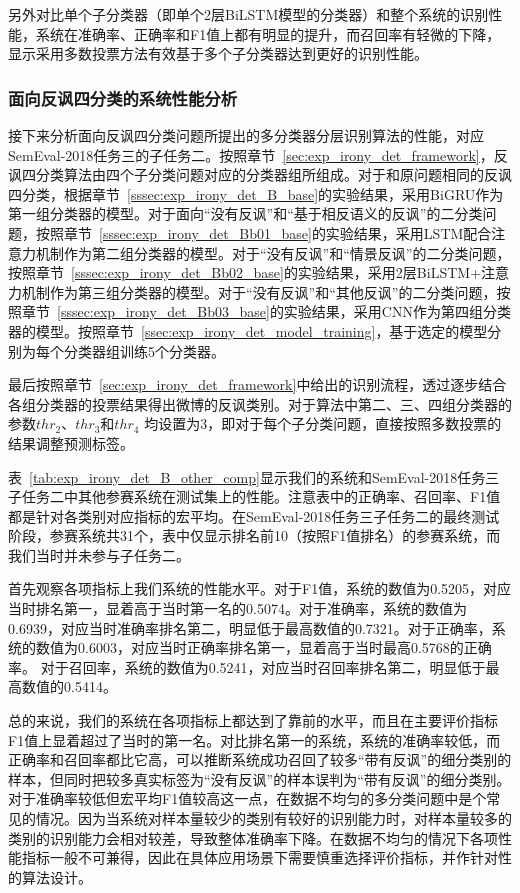 另外对比单个子分类器（即单个2层BiLSTM模型的分类器）和整个系统的识别性能，系统在准确率、正确率和F1值上都有明显的提升，而召回率有轻微的下降，显示采用多数投票方法有效基于多个子分类器达到更好的识别性能。

\subsubsection{面向反讽四分类的系统性能分析}

接下来分析面向反讽四分类问题所提出的多分类器分层识别算法的性能，对应SemEval-2018任务三的子任务二。按照章节~\ref{sec:exp_irony_det_framework}，反讽四分类算法由四个子分类问题对应的分类器组所组成。对于和原问题相同的反讽四分类，根据章节~\ref{sssec:exp_irony_det_B_base}的实验结果，采用BiGRU作为第一组分类器的模型。对于面向“没有反讽”和“基于相反语义的反讽”的二分类问题，按照章节~\ref{sssec:exp_irony_det_Bb01_base}的实验结果，采用LSTM配合注意力机制作为第二组分类器的模型。对于“没有反讽”和“情景反讽”的二分类问题，按照章节~\ref{sssec:exp_irony_det_Bb02_base}的实验结果，采用2层BiLSTM+注意力机制作为第三组分类器的模型。对于“没有反讽”和“其他反讽”的二分类问题，按照章节~\ref{sssec:exp_irony_det_Bb03_base}的实验结果，采用CNN作为第四组分类器的模型。按照章节~\ref{ssec:exp_irony_det_model_training}，基于选定的模型分别为每个分类器组训练5个分类器。

最后按照章节~\ref{sec:exp_irony_det_framework}中给出的识别流程，透过逐步结合各组分类器的投票结果得出微博的反讽类别。对于算法中第二、三、四组分类器的参数$thr_2$、$thr_3$和$thr_4$ 均设置为3，即对于每个子分类问题，直接按照多数投票的结果调整预测标签。

表~\ref{tab:exp_irony_det_B_other_comp}显示我们的系统和SemEval-2018任务三子任务二中其他参赛系统在测试集上的性能。注意表中的正确率、召回率、F1值都是针对各类别对应指标的宏平均。在SemEval-2018任务三子任务二的最终测试阶段，参赛系统共31个，表中仅显示排名前10（按照F1值排名）的参赛系统，而我们当时并未参与子任务二。
 
首先观察各项指标上我们系统的性能水平。对于F1值，系统的数值为0.5205，对应当时排名第一，显着高于当时第一名的0.5074。对于准确率，系统的数值为0.6939，对应当时准确率排名第二，明显低于最高数值的0.7321。对于正确率，系统的数值为0.6003，对应当时正确率排名第一，显着高于当时最高0.5768的正确率。
对于召回率，系统的数值为0.5241，对应当时召回率排名第二，明显低于最高数值的0.5414。

总的来说，我们的系统在各项指标上都达到了靠前的水平，而且在主要评价指标F1值上显着超过了当时的第一名。对比排名第一的系统，系统的准确率较低，而正确率和召回率都比它高，可以推断系统成功召回了较多“带有反讽”的细分类别的样本，但同时把较多真实标签为“没有反讽”的样本误判为“带有反讽”的细分类别。对于准确率较低但宏平均F1值较高这一点，在数据不均匀的多分类问题中是个常见的情况。因为当系统对样本量较少的类别有较好的识别能力时，对样本量较多的类别的识别能力会相对较差，导致整体准确率下降。在数据不均匀的情况下各项性能指标一般不可兼得，因此在具体应用场景下需要慎重选择评价指标，并作针对性的算法设计。

